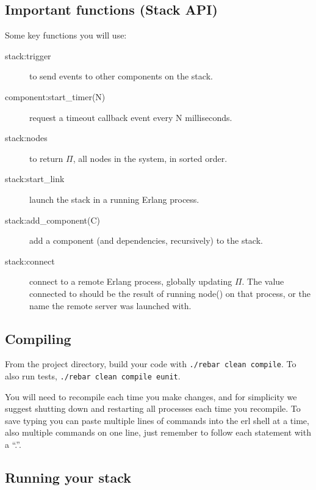 \documentclass[a4paper]{article}
\begin{document}

\subsection{Important functions (Stack API)} %
\label{sub:api}

Some key functions you will use:

\begin{description}
  \item[stack:trigger] to send events to other components on the stack.
  \item[component:start\_timer(N)] request a timeout callback event every N milliseconds.
  \item[stack:nodes] to return $\Pi$, all nodes in the system, in sorted order.

  \item[stack:start\_link] launch the stack in a running Erlang process.

  \item[stack:add\_component(C)] add a component (and dependencies, recursively) to the
  stack.

  \item[stack:connect] connect to a remote Erlang process, globally updating $\Pi$.
      The value connected to should be the result of running node() on that process, or the name the remote server was launched with.
\end{description}



\subsection{Compiling} %
\label{sub:compiling_and_running_the_program}

From the project directory, build your code with \verb!./rebar clean compile!.
To also run tests, \verb!./rebar clean compile eunit!.

You will need to recompile each time you make changes, and for simplicity we
suggest shutting down and restarting all processes each time you recompile.
To save typing you can paste multiple lines of commands into the erl shell at
a time, also multiple commands on one line, just remember to follow each
statement with a ``.''.


\subsection{Running your stack} %
\label{sub:running_your_stack}
\end{document}
